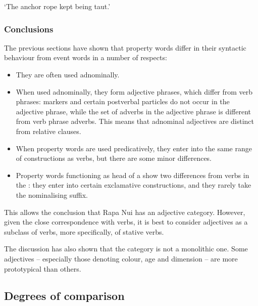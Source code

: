 \glt 
‘The anchor rope kept being taut.’ \textstyleExampleref{[R361.061]} 
\z

\subsubsection{Conclusions}\label{sec:3.5.1.7}

The previous sections have shown that property words differ in their syntactic behaviour from event words in a number of respects:

\begin{itemize}
\item 
They are often used adnominally.

\item 
When used adnominally, they form adjective phrases, which differ from verb phrases:  markers and certain postverbal particles do not occur in the adjective phrase, while the set of adverbs in the adjective phrase is different from verb phrase adverbs. This means that adnominal adjectives are distinct from relative clauses.

\item 
When property words are used predicatively, they enter into the same range of constructions as verbs, but there are some minor differences.

\item 
Property words functioning as head of a  show two differences from verbs in the : they enter into certain exclamative constructions, and they rarely take the nominalising suffix.

\end{itemize}

This allows the conclusion that Rapa Nui has an adjective category. However, given the close correspondence with verbs, it is best to consider adjectives as a subclass of verbs, more specifically, of stative verbs. 

The discussion has also shown that the  category is not a monolithic one. Some adjectives – especially those denoting colour, age and dimension – are more prototypical than others. 

\subsection{Degrees of comparison}\label{sec:3.5.2}
